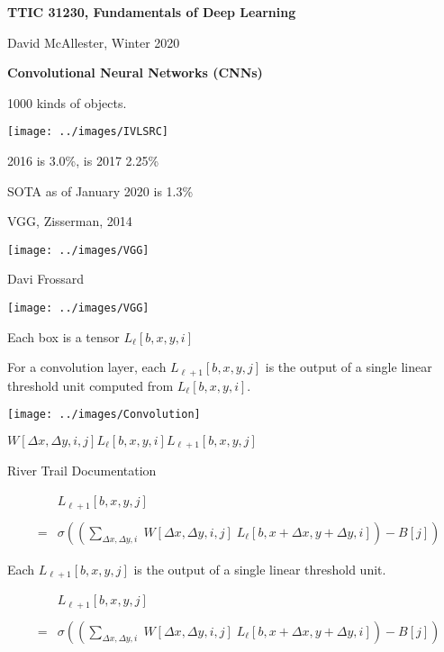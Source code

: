 




{\Huge

  \centerline{\bf TTIC 31230, Fundamentals of Deep Learning}
  \bigskip
  \centerline{David McAllester, Winter 2020}

    \vfill
  \centerline{\bf Convolutional Neural Networks (CNNs)}
  \vfill
  \vfill



1000 kinds of objects.

\vfill
\centerline{\texttt{[image: ../images/IVLSRC]}}
2016 is 3.0\%, is 2017 2.25\%

\medskip
SOTA as of January 2020 is 1.3\%

{VGG, Zisserman, 2014}

\centerline{\texttt{[image: ../images/VGG]}}
\centerline{\large Davi Frossard}


\centerline{\texttt{[image: ../images/VGG]}}

\vfill
Each box is a tensor $L_\ell[b,x,y,i]$

\vfill
For a convolution layer, each $L_{{\ell+1}}[b,x,y,j]$ is the output of a single linear threshold unit computed from $L_\ell[b,x,y,i]$.


\centerline{\texttt{[image: ../images/Convolution]}}
\centerline{$W[\Delta x,\Delta y,i,j]$\hspace{6ex}$L_{{\ell}}[b,x,y,i]$\hspace{6ex}$L_{{\ell+1}}[b,x,y,j]$}
\centerline{\large River Trail Documentation}

\vfill
\begin{eqnarray*}
 & &  L_{{\ell+1}}[b,x,y,j] \\
 \\
 & = &   \sigma\left(\left(\sum_{\Delta x, \Delta y, i}\;W[\Delta x, \Delta y, i,j]\; L_{{\ell}}[b,x + \Delta x, y + \Delta y, i]\right) - B[j]\right)
\end{eqnarray*}


Each $L_{{\ell+1}}[b,x,y,j]$ is the output of a single linear threshold unit.

\bigskip
\begin{eqnarray*}
 & &  L_{{\ell+1}}[b,x,y,j] \\
 \\
 & = &   \sigma\left(\left(\sum_{\Delta x, \Delta y, i}\;W[\Delta x, \Delta y, i,j]\; L_{{\ell}}[b,x + \Delta x, y + \Delta y, i]\right) - B[j]\right)
\end{eqnarray*}

}
